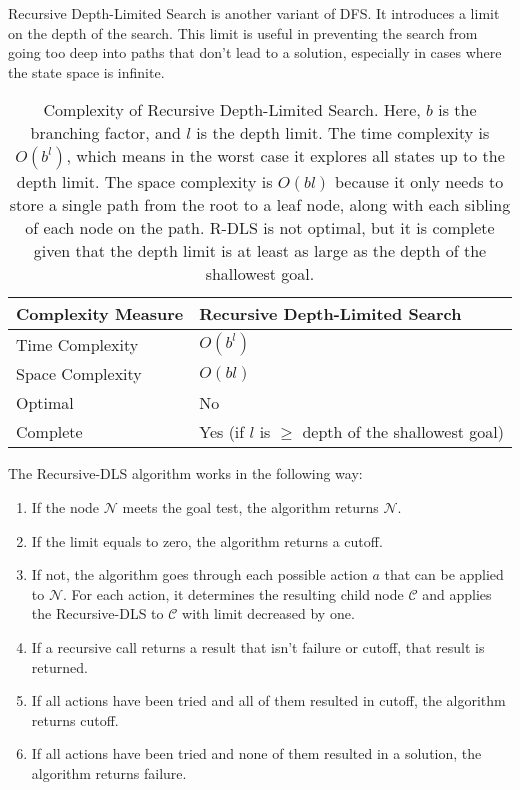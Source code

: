 \documentclass[a4paper,UKenglish,cleveref, autoref, thm-restate]{qlinhta}
\begin{document}
Recursive Depth-Limited Search is another variant of DFS. It introduces a limit on the depth of the search. This limit is useful in preventing the search from going too deep into paths that don't lead to a solution, especially in cases where the state space is infinite.
\begin{table}[H]
\centering
\begin{tabular}{|l|l|}
\hline
\textbf{Complexity Measure} & \textbf{Recursive Depth-Limited Search} \\
\hline
Time Complexity & $O(b^l)$ \\
\hline
Space Complexity & $O(bl)$ \\
\hline
Optimal & No \\
\hline
Complete & Yes (if $l$ is $\geq$ depth of the shallowest goal) \\
\hline
\end{tabular}
\caption{Complexity of Recursive Depth-Limited Search. Here, $b$ is the branching factor, and $l$ is the depth limit. The time complexity is $O(b^l)$, which means in the worst case it explores all states up to the depth limit. The space complexity is $O(bl)$ because it only needs to store a single path from the root to a leaf node, along with each sibling of each node on the path. R-DLS is not optimal, but it is complete given that the depth limit is at least as large as the depth of the shallowest goal.}
\label{tab:rdls_complexity_detailed}
\end{table}

The Recursive-DLS algorithm works in the following way:
\begin{enumerate}
    \item If the node $\mathcal{N}$ meets the goal test, the algorithm returns $\mathcal{N}$.
    \item If the limit equals to zero, the algorithm returns a cutoff.
    \item If not, the algorithm goes through each possible action $a$ that can be applied to $\mathcal{N}$. For each action, it determines the resulting child node $\mathcal{C}$ and applies the Recursive-DLS to $\mathcal{C}$ with limit decreased by one.
    \item If a recursive call returns a result that isn't failure or cutoff, that result is returned.
    \item If all actions have been tried and all of them resulted in cutoff, the algorithm returns cutoff.
    \item If all actions have been tried and none of them resulted in a solution, the algorithm returns failure.
\end{enumerate}
\end{document}
